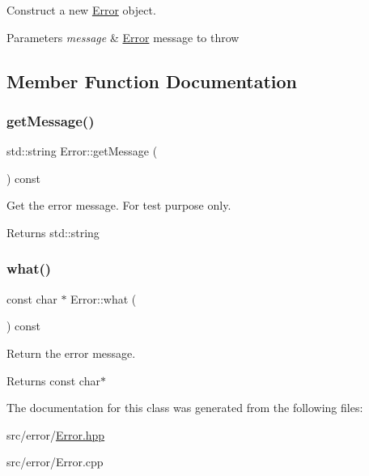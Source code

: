 Construct a new \mbox{\hyperlink{class_error}{Error}} object. 


\begin{DoxyParams}{Parameters}
{\em message} & \mbox{\hyperlink{class_error}{Error}} message to throw \\
\hline
\end{DoxyParams}


\subsection{Member Function Documentation}
\mbox{\label{class_error_a25241c4a23ba6e25a7e8169edc163d9d}} 
\subsubsection{\texorpdfstring{getMessage()}{getMessage()}}
{\footnotesize\ttfamily std\+::string Error\+::get\+Message (\begin{DoxyParamCaption}{ }\end{DoxyParamCaption}) const}



Get the error message. For test purpose only. 

\begin{DoxyReturn}{Returns}
std\+::string 
\end{DoxyReturn}
\mbox{\label{class_error_a2735217cefcd50320daf7733cf3150a7}} 
\subsubsection{\texorpdfstring{what()}{what()}}
{\footnotesize\ttfamily const char $\ast$ Error\+::what (\begin{DoxyParamCaption}{ }\end{DoxyParamCaption}) const\hspace{0.3cm}{\ttfamily [noexcept]}}



Return the error message. 

\begin{DoxyReturn}{Returns}
const char$\ast$ 
\end{DoxyReturn}


The documentation for this class was generated from the following files\+:\begin{DoxyCompactItemize}
\item 
src/error/\mbox{\hyperlink{_error_8hpp}{Error.\+hpp}}\item 
src/error/Error.\+cpp\end{DoxyCompactItemize}
